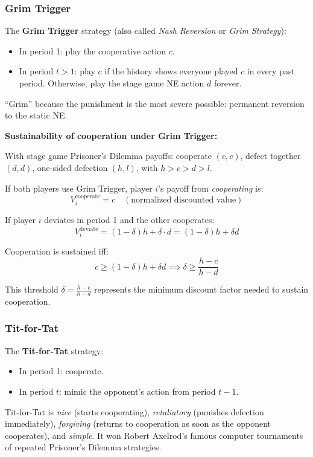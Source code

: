 \documentclass[hidelinks]{article}
\begin{document}
\subsubsection{Grim Trigger}

The \textbf{Grim Trigger} strategy (also called \textit{Nash Reversion} or \textit{Grim Strategy}):
\begin{itemize}
    \item In period 1: play the cooperative action $c$.
    \item In period $t > 1$: play $c$ if the history shows everyone played $c$ in every past period. Otherwise, play the stage game NE action $d$ forever.
\end{itemize}

``Grim'' because the punishment is the most severe possible: permanent reversion to the static NE.

\textbf{Sustainability of cooperation under Grim Trigger:}

With stage game Prisoner's Dilemma payoffs: cooperate $(c,c)$, defect together $(d,d)$, one-sided defection $(h, l)$, with $h > c > d > l$.

If both players use Grim Trigger, player $i$'s payoff from \textit{cooperating} is:
\[
V_i^{\text{cooperate}} = c \quad (\text{normalized discounted value})
\]

If player $i$ deviates in period 1 and the other cooperates:
\[
V_i^{\text{deviate}} = (1-\delta) h + \delta \cdot d = (1-\delta)h + \delta d
\]

Cooperation is sustained iff:
\[
c \geq (1-\delta)h + \delta d \implies \delta \geq \frac{h - c}{h - d}
\]

This threshold $\bar{\delta} = \frac{h-c}{h-d}$ represents the minimum discount factor needed to sustain cooperation.

\subsubsection{Tit-for-Tat}

The \textbf{Tit-for-Tat} strategy:
\begin{itemize}
    \item In period 1: cooperate.
    \item In period $t$: mimic the opponent's action from period $t-1$.
\end{itemize}

Tit-for-Tat is \textit{nice} (starts cooperating), \textit{retaliatory} (punishes defection immediately), \textit{forgiving} (returns to cooperation as soon as the opponent cooperates), and \textit{simple}. It won Robert Axelrod's famous computer tournaments of repeated Prisoner's Dilemma strategies.
\end{document}
